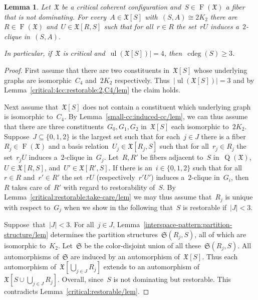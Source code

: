 \documentclass[english,a4paper]{article}
\theoremstyle{plain}
\newtheorem{lemma}      [theorem]{Lemma}
\theoremstyle{definition}
\DeclareMathOperator{\Fibers}{F}
\newcommand{\coherentConfig}{\ensuremath{\mathfrak{X}}}
\newcommand{\fibers}[1]{\ensuremath{\Fibers \left( #1 \right)}}
\newcommand{\interspace}[2]{\ensuremath{\coherentConfig[#1,#2]}}
\newcommand{\inducedCC}[1]{\ensuremath{\coherentConfig[#1]}}
\DeclareMathOperator*{\ul}{ul}
\newcommand{\arcs}{\ensuremath{A}}
\DeclareMathOperator*{\Quotient}{Q}
\newcommand{\quotientGraph}[1]{\ensuremath{\Quotient(#1)}}
\DeclareMathOperator{\ColorDeg}{cdeg}
\newcommand{\colorDeg}[1]{\ensuremath{\ColorDeg\left(#1\right)}}
\newcommand{\partitionStructure}[1]{\ensuremath{\mathfrak{S}(#1)}}
\newcommand{\clique}[1]{\ensuremath{K_{#1}}}
\newcommand{\cycle}[1]{\ensuremath{C_{#1}}}
\newcommand{\disjointCliques}[2]{\ensuremath{#1 \clique{#2}}}
\begin{document}
\begin{lemma}
\label{critical:4-cc:restorable:DUC/lem}
    Let~$\coherentConfig$ be a critical coherent configuration and~$S \in \fibers{\coherentConfig}$ a fiber that is not dominating.
    For every~$\arcs \in \inducedCC{S}$ with~$(S,\arcs) \cong \disjointCliques{2}{2}$ there are~$R \in \fibers{\coherentConfig}$ and~$U \in \interspace{R}{S}$ such that for all~$r \in R$ the set~$r U$ induces a~$2$-clique in~$(S,\arcs)$.

    In particular, if~$\coherentConfig$ is critical and~$\ul(\inducedCC{S})| = 4$, then~$\colorDeg{S} \geq 3$.
\end{lemma}
\begin{proof}
    First assume that there are two constituents in~$\inducedCC{S}$ whose underlying graphs are isomorphic~$\cycle{4}$ and~$2K_2$ respectively.
    Thus~$|\ul(\inducedCC{S})| = 3$ and by Lemma~\ref{critical:4cc:restorable:2,C4/lem} the claim holds.

    Next assume that~$\inducedCC{S}$ does not contain a constituent which underlying graph is isomorphic to~$\cycle{4}$.
    By Lemma~\ref{small-cc:induced-cc/lem}, we can thus assume that there are three constituents~$G_0,G_1,G_2$ in~$\inducedCC{S}$ each isomorphic to~$\disjointCliques{2}{2}$.
    Suppose~$J \subseteq \{0,1,2\}$ is the largest set such that for each~$j \in J$ there is a fiber~$R_j \in \fibers{\coherentConfig}$ and a basis relation~$U_j \in \interspace{R_j}{S}$ such that for all~$r_j \in R_j$ the set~$r_j U$ induces a~$2$-clique in~$G_j$.
    Let~$R,R'$ be fibers adjacent to~$S$ in~$\quotientGraph{\coherentConfig}$,~$U \in \interspace{R}{S}$, and~$U' \in \interspace{R'}{S}$.
    If there is an~$i \in \{0,1,2\}$ such that for all~$r \in R$ and~$r' \in R'$ the set~$rU$ (respectively~$r'U'$) induces a~$2$-clique in~$G_i$, then~$R$ takes care of~$R'$  with regard to restorability of~$S$.
    By Lemma~\ref{critical:restorable:take-care/lem} we may thus assume that~$R_j$ is unique with respect to~$G_j$ when we show in the following that~$S$ is restorable if~$|J| < 3$.

    Suppose~that~$|J| < 3$.
    For all~$j \in J$, Lemma~\ref{interspace-pattern:partition-structure/lem} determines the partition structures~$\partitionStructure{R_j,S}$, all of which are isomorphic to~$K_2$.
    Let~$\mathfrak{S}$ be the color-disjoint union of all these~$\partitionStructure{R_j,S}$.
    All automorphisms of~$\mathfrak{S}$ are induced by an automorphism of~$\inducedCC{S}$.
    Thus each automorphism of~$\inducedCC{ \bigcup_{j \in J} R_j}$ extends to an automorphism of~$\inducedCC{S \cup \bigcup_{j \in J} R_j}$.
    Overall, since~$S$ is not dominating but restorable.
    This contradicts Lemma~\ref{critical:restorable/lem}.
\end{proof}
\end{document}
